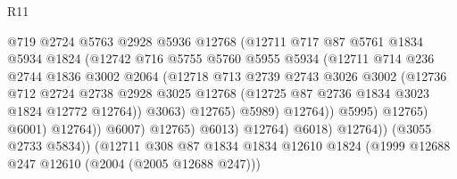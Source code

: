 \begin{lexlean}{R11}
\begin{coremodule}
                                    @719
                                    @2724
                                    @5763
                                    @2928
                                    @5936
                                    @12768
                                    (@12711
                                      @717
                                      @87
                                      @5761
                                      @1834
                                      @5934
                                      @1824
                                      (@12742
                                        @716
                                        @5755
                                        @5760
                                        @5955
                                        @5934
                                        (@12711
                                          @714
                                          @236
                                          @2744
                                          @1836
                                          @3002
                                          @2064
                                          (@12718
                                            @713
                                            @2739
                                            @2743
                                            @3026
                                            @3002
                                            (@12736
                                              @712
                                              @2724
                                              @2738
                                              @2928
                                              @3025
                                              @12768
                                              (@12725 @87 @2736 @1834 @3023 @1824 @12772 @12764))
                                            @3063)
                                          @12765)
                                        @5989)
                                      @12764))
                                  @5995)
                                @12765)
                              @6001)
                            @12764))
                        @6007)
                      @12765)
                    @6013)
                  @12764)
                @6018)
              @12764))
          (@3055 @2733 @5834))
        (@12711
          @308
          @87
          @1834
          @1834
          @12610
          @1824
          (@1999 @12688 @247 @12610 (@2004 (@2005 @12688 @247)))

\end{coremodule}
\end{lexlean}
